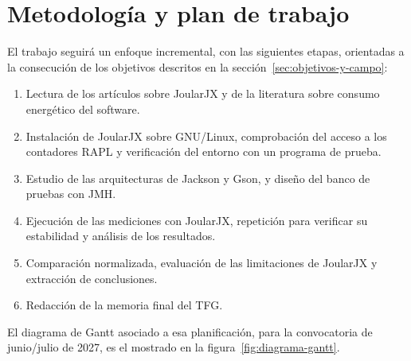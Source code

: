\documentclass[11pt,a4paper,oneside]{article}
\begin{document}
%


\section{Metodología y plan de trabajo}
\label{sec:metodologia-y-plan}

El trabajo seguirá un enfoque incremental, con las siguientes etapas,
orientadas a la consecución de los objetivos descritos en la
sección~\ref{sec:objetivos-y-campo}:

\begin{enumerate}
\item Lectura de los artículos sobre JoularJX y de la literatura sobre
  consumo energético del software.

\item Instalación de JoularJX sobre GNU/Linux, comprobación del acceso
  a los contadores RAPL y verificación del entorno con un programa de
  prueba.

\item Estudio de las arquitecturas de Jackson y Gson, y diseño del banco
  de pruebas con JMH.

\item Ejecución de las mediciones con JoularJX, repetición para
  verificar su estabilidad y análisis de los resultados.

\item Comparación normalizada, evaluación de las limitaciones de
  JoularJX y extracción de conclusiones.

\item Redacción de la memoria final del TFG.
\end{enumerate}

El diagrama de Gantt asociado a esa planificación, para la convocatoria
de junio/julio de 2027, es el mostrado en la
figura~\ref{fig:diagrama-gantt}.
\end{document}
